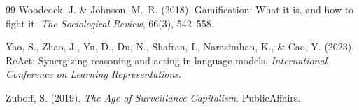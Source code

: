 \documentclass[12pt,a4paper]{article}
\begin{document}
\begin{thebibliography}{99}
Woodcock, J. \& Johnson, M.~R. (2018). Gamification: What it is, and how to fight it. \emph{The Sociological Review}, 66(3), 542--558.

Yao, S., Zhao, J., Yu, D., Du, N., Shafran, I., Narasimhan, K., \& Cao, Y. (2023). ReAct: Synergizing reasoning and acting in language models. \emph{International Conference on Learning Representations}.

Zuboff, S. (2019). \emph{The Age of Surveillance Capitalism}. PublicAffairs.

\end{thebibliography}
\end{document}
